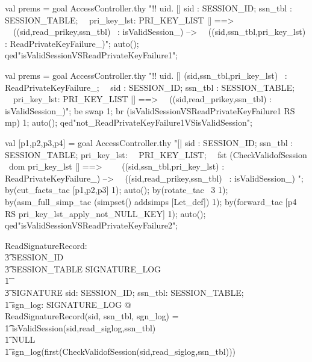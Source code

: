 \documentclass[a4paper,pdftex]{article}
\newenvironment{holz-proof}{\comment}{\endcomment}
\begin{document}
\begin{holz-proof}

val prems = goal AccessController.thy 
"!! uid. [| sid : SESSION_ID; ssn_tbl : SESSION_TABLE;       \
\           pri_key_lst: PRI_KEY_LIST |] ==>                 \
\   ((sid,read_prikey,ssn_tbl) ~: isValidSession_) -->       \
\   ((sid,ssn_tbl,pri_key_lst) : ReadPrivateKeyFailure_)";
auto();
qed"isValidSessionVSReadPrivateKeyFailure1";


val prems = goal AccessController.thy 
"!! uid. [| (sid,ssn_tbl,pri_key_lst) ~: ReadPrivateKeyFailure_; \
\            sid : SESSION_ID; ssn_tbl : SESSION_TABLE;          \
\           pri_key_lst: PRI_KEY_LIST |] ==>                     \
\   ((sid,read_prikey,ssn_tbl) : isValidSession_)";
be swap 1;
br (isValidSessionVSReadPrivateKeyFailure1 RS mp) 1;
auto();
qed"not_ReadPrivateKeyFailure1VSisValidSession";



val [p1,p2,p3,p4] = goal AccessController.thy 
"[| sid : SESSION_ID; ssn_tbl : SESSION_TABLE; pri_key_lst:      \
\   PRI_KEY_LIST;                                                \
\   fst (CheckValidofSession %
\           dom pri_key_lst |] ==>                               \
\                                                                \
\ ((sid,ssn_tbl,pri_key_lst) : ReadPrivateKeyFailure_) -->       \ 
\  ((sid,read_prikey,ssn_tbl) ~: isValidSession_) ";
by(cut_facts_tac [p1,p2,p3] 1);
auto();
by(rotate_tac ~3 1);
by(asm_full_simp_tac (simpset() addsimps [Let_def]) 1);
by(forward_tac [p4 RS pri_key_lst_apply_not_NULL_KEY] 1);
auto();
qed"isValidSessionVSReadPrivateKeyFailure2";



\end{holz-proof}


\index{ReadSignatureRecord}
\begin{axdef}
ReadSignatureRecord: \\
\t3 SESSION\_ID \cross \\
\t3 SESSION\_TABLE \cross SIGNATURE\_LOG \\
\t1 \fun \\
\t3 SIGNATURE
\where
\forall sid: SESSION\_ID; ssn\_tbl: SESSION\_TABLE; \\
\t1 sgn\_log: SIGNATURE\_LOG @ \\
ReadSignatureRecord(sid, ssn\_tbl, sgn\_log) = \\
\t1 \IF  \lnot isValidSession(sid,read\_siglog,ssn\_tbl) \\
\t1 \THEN NULL \\
\t1 \ELSE sgn\_log(first(CheckValidofSession(sid,read\_siglog,ssn\_tbl)))
\end{axdef}
\end{document}
